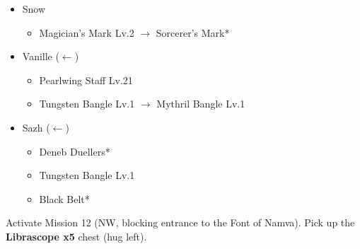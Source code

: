 \begin{menu}
\begin{itemize}
		\equip
		\begin{itemize}
			\item Snow
				\begin{itemize}
					\item Magician's Mark Lv.2 $\rightarrow$ Sorcerer's Mark*
				\end{itemize}
			\item Vanille ($\leftarrow$)
			      \begin{itemize}
				      \item Pearlwing Staff Lv.21
				      \item Tungsten Bangle Lv.1 $\rightarrow$ Mythril Bangle Lv.1
			      \end{itemize}
			\item Sazh ($\leftarrow$)
			      \begin{itemize}
				      \item Deneb Duellers*
				      \item Tungsten Bangle Lv.1
				      \item Black Belt*
			      \end{itemize}
		\end{itemize}
	\end{itemize}
\end{menu}

\renewcommand{\first}{[1] Hero's Charge (\syn/\med/\com)}
\renewcommand{\second}{[2] Tri-Disaster (\rav/\rav/\rav)}
\renewcommand{\third}{[3] Hero's Charge (\syn/\med/\com)}
\renewcommand{\fourth}{[4] Guerilla (\syn/\sab/\rav)}
\renewcommand{\fifth}{[5] Aggression (\com/\rav/\com)}
\renewcommand{\sixth}{[6] Relentless Assault (\rav/\rav/\com)}

Activate Mission 12 (NW, blocking entrance to the Font of Namva).
Pick up the \textbf{Librascope x5} chest (hug left).

